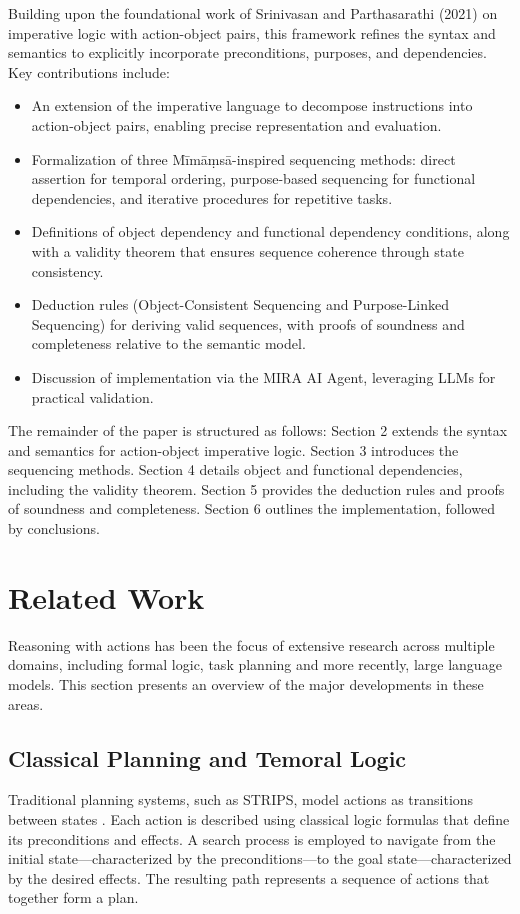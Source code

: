 \documentclass[a4paper,11pt]{lmcs}
\begin{document}
Building upon the foundational work of Srinivasan and Parthasarathi (2021) on imperative logic with action-object pairs, this framework refines the syntax and semantics to explicitly incorporate preconditions, purposes, and dependencies. Key contributions include:
\begin{itemize}
\item An extension of the imperative language to decompose instructions into action-object pairs, enabling precise representation and evaluation.
\item Formalization of three Mīmāṃsā-inspired sequencing methods: direct assertion for temporal ordering, purpose-based sequencing for functional dependencies, and iterative procedures for repetitive tasks.
\item Definitions of object dependency and functional dependency conditions, along with a validity theorem that ensures sequence coherence through state consistency.
\item Deduction rules (Object-Consistent Sequencing and Purpose-Linked Sequencing) for deriving valid sequences, with proofs of soundness and completeness relative to the semantic model.
\item Discussion of implementation via the MIRA AI Agent, leveraging LLMs for practical validation.
\end{itemize}
The remainder of the paper is structured as follows: Section 2 extends the syntax and semantics for action-object imperative logic. Section 3 introduces the sequencing methods. Section 4 details object and functional dependencies, including the validity theorem. Section 5 provides the deduction rules and proofs of soundness and completeness. Section 6 outlines the implementation, followed by conclusions.

\section{Related Work}
Reasoning with actions has been the focus of extensive research across multiple domains, including formal logic, task planning and more recently, large language models. This section presents an overview of the major developments in these areas.
\subsection{Classical Planning and Temoral Logic}
Traditional planning systems, such as STRIPS, model actions as transitions between states \citep{strips}. Each action is described using classical logic formulas that define its preconditions and effects. A search process is employed to navigate from the initial state—characterized by the preconditions—to the goal state—characterized by the desired effects. The resulting path represents a sequence of actions that together form a plan.
\end{document}
